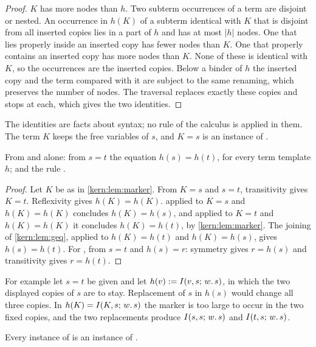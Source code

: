 \begin{proof}
$K$ has more nodes than $h$.  Two subterm occurrences of a term are disjoint
or nested.  An occurrence in $h(K)$ of a subterm identical with $K$ that is
disjoint from all inserted copies lies in a part of $h$ and has at most
$|h|$ nodes.  One that lies properly inside an inserted copy has fewer nodes
than $K$.  One that properly contains an inserted copy has more nodes than
$K$.  None of these is identical with $K$, so the occurrences are the
inserted copies.  Below a binder of $h$ the inserted copy and the term
compared with it are subject to the same renaming, which preserves the
number of nodes.  The traversal replaces exactly these copies and stops at
each, which gives the two identities.
\end{proof}

The identities are facts about syntax; no rule of the calculus is applied in
them.  The term $K$ keeps the free variables of $s$, and $K=s$ is an
instance of .

\begin{lemma}
\label{kern:lem:gcong}
From  and  alone: from $s=t$ the equation
$h(s)=h(t)$, for every term template $h$; and the rule .
\end{lemma}

\begin{proof}
Let $K$ be as in \cref{kern:lem:marker}.  From $K=s$ and $s=t$,
transitivity gives $K=t$.  Reflexivity gives $h(K)=h(K)$.  
applied to $K=s$ and $h(K)=h(K)$ concludes $h(K)=h(s)$, and applied to $K=t$
and $h(K)=h(K)$ it concludes $h(K)=h(t)$, by \cref{kern:lem:marker}.  The
joining of \cref{kern:lem:geq}, applied to $h(K)=h(t)$ and $h(K)=h(s)$,
gives $h(s)=h(t)$.  For , from $s=t$ and $h(s)=r$: symmetry
gives $r=h(s)$ and transitivity gives $r=h(t)$.
\end{proof}

For example let $s=t$ be given and let $h(v)\mathrel{:=}I(v,s;\,w.\,s)$, in which
the two displayed copies of $s$ are to stay.  Replacement of $s$ in $h(s)$
would change all three copies.  In $h(K)=I(K,s;\,w.\,s)$ the marker is too
large to occur in the two fixed copies, and the two replacements produce
$I(s,s;\,w.\,s)$ and $I(t,s;\,w.\,s)$.

\begin{lemma}
\label{kern:lem:gsound}
Every instance of  is an instance of .
\end{lemma}

